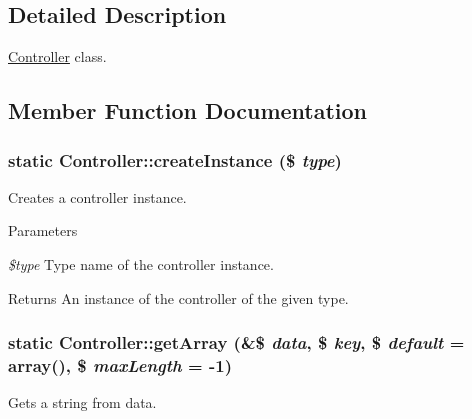 \subsection{Detailed Description}
\hyperlink{classController}{Controller} class. 

\subsection{Member Function Documentation}
\hypertarget{classController_aafbd169c4ea409841c28d01db9081c83}{
\subsubsection[{createInstance}]{\setlength{\rightskip}{0pt plus 5cm}static Controller::createInstance (\$ {\em type})}}
\label{classController_aafbd169c4ea409841c28d01db9081c83}
Creates a controller instance.


\begin{DoxyParams}{Parameters}
\item[{\em \$type}]Type name of the controller instance.\end{DoxyParams}
\begin{DoxyReturn}{Returns}
An instance of the controller of the given type. 
\end{DoxyReturn}
\hypertarget{classController_ae226e2b1c593b5a0e1c406d9ae5b3c21}{
\subsubsection[{getArray}]{\setlength{\rightskip}{0pt plus 5cm}static Controller::getArray (\&\$ {\em data}, \/  \$ {\em key}, \/  \$ {\em default} = {\ttfamily array()}, \/  \$ {\em maxLength} = {\ttfamily -\/1})}}
\label{classController_ae226e2b1c593b5a0e1c406d9ae5b3c21}
Gets a string from data.


